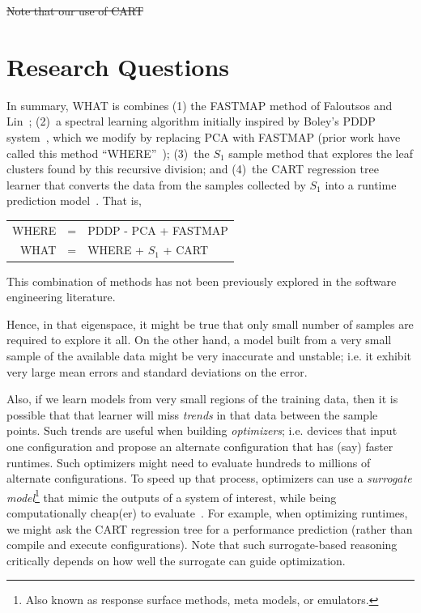 \documentclass{sig-alternative}
\begin{document}
\st{Note that our use of CART} 
\section{Research Questions} 
In summary, WHAT is combines
(1) the FASTMAP method of Faloutsos and Lin~\cite{Faloutsos1995};
(2)~a spectral learning algorithm initially   inspired by    Boley's PDDP system~\cite{boley98}, which we modify
by replacing  PCA with FASTMAP (prior work have called this
method ``WHERE''~\cite{me12d});
(3)~the $S_1$ sample method that explores the leaf clusters found by this recursive division;
and (4)~the CART regression tree learner that converts the data from the samples collected by $S_1$
into a runtime prediction model~\cite{breiman1984}.
That is,
\begin{center}
\begin{tabular}{rcl}
WHERE& = &PDDP - PCA + FASTMAP\\ 
WHAT& =  & WHERE + $S_1$ + CART
\end{tabular}
\end{center}
This combination of methods has not been previously explored in the
software engineering literature.


Hence, in that eigenspace, it might be true that only small
number of samples are required to explore it all.
On the other hand, a model built from a very small sample of the available data might
be very inaccurate and unstable; i.e. it exhibit very large mean errors and standard deviations on the error.

Also, if we learn models from very small regions of the training data,
then it is  possible that that learner will miss {\em trends} in that data
between the sample points. Such trends are useful when building {\em optimizers};
i.e. devices that input one configuration and propose an alternate
configuration that has (say) faster runtimes. Such optimizers might
need to evaluate hundreds to millions of alternate configurations. 
To speed up that process, optimizers can use a {\em surrogate model}\footnote{Also known as response surface methods, meta models, or emulators.}
that  mimic the outputs of a system of interest, while being computationally cheap(er) to evaluate~\cite{loshchilov13}. For example, when optimizing
runtimes, we might ask the CART regression tree for a performance
prediction (rather than compile and execute
configurations).  Note that such surrogate-based
reasoning critically depends on how well the surrogate can guide optimization.
\end{document}
